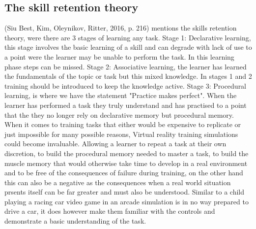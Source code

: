 \documentclass[10pt,journal,compsoc]{IEEEtran}
\begin{document}
	\subsection{The skill retention theory}
	(Siu Best, Kim, Oleynikov, Ritter, 2016, p. 216) mentions the skills retention theory, were there are 3 stages of learning any task. Stage  1: Declarative learning, this stage involves the basic learning of a skill and can degrade with lack of use to a point were the learner may be unable to perform the task. In this learning phase steps can be missed. \newline Stage 2: Associative  learning, the learner has learned the fundamentals of the topic or task but this mixed knowledge. In stages 1 and 2 training should be introduced to keep the knowledge active.\newline \newline
	Stage 3: Procedural learning, is where we have the statement "Practice makes perfect". When the learner has performed a task they truly understand and has practised to a point that the they no longer rely on declarative memory but procedural memory. \newline
	When it comes to training tasks that either would be expensive to replicate or just impossible for many possible reasons, Virtual reality training simulations could become invaluable. Allowing a learner to repeat a task at their own discretion, to build the procedural memory needed to master a task, to build the muscle memory that would otherwise take time to develop in a real environment and to be free of the consequences of failure during training, on the other hand this can also be a negative as the consequences when a real world situation prsents itself can be far greater and must also be understood. Similar to a child playing a racing car video game in an arcade simulation is in no way prepared to drive a car, it does however make them familiar with the controls and demonstrate a basic understanding of the task.
	
\end{document}
